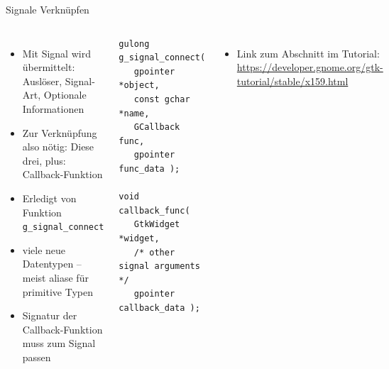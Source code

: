 \begin{frame}[fragile]{Signale Verknüpfen}
%
\begin{columns}[T]
\begin{itemize}
\item Mit Signal wird übermittelt: Auslöser, Signal-Art, Optionale Informationen
\item Zur Verknüpfung also nötig: Diese drei, plus: Callback-Funktion
\item Erledigt von Funktion \texttt{g\_signal\_connect}
\item viele neue Datentypen -- meist aliase für primitive Typen
\item Signatur der Callback-Funktion muss zum Signal passen
\end{itemize}
%
\vspace{-6pt}
\begin{codebox}
\begin{verbatim}
gulong g_signal_connect(
   gpointer      *object,
   const gchar   *name,
   GCallback     func,
   gpointer      func_data );

void callback_func( 
   GtkWidget *widget,
   /* other signal arguments */
   gpointer   callback_data );
\end{verbatim}
\end{codebox}
%
\begin{itemize}
\item Link zum Abschnitt im Tutorial: \\
	\footnotesize\url{https://developer.gnome.org/gtk-tutorial/stable/x159.html}
\end{itemize}
\end{columns}
%
\end{frame}


